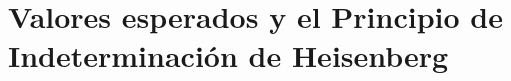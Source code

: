 \section{Valores esperados y el Principio de Indeterminación de Heisenberg}
\label{Valores esperados y el Principio de Indeterminación de Heisenberg}